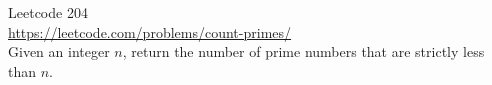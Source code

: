   Leetcode 204 \\
  \url{https://leetcode.com/problems/count-primes/} \\
  Given an integer $n$, return the number of prime numbers that are strictly
  less than $n$.
